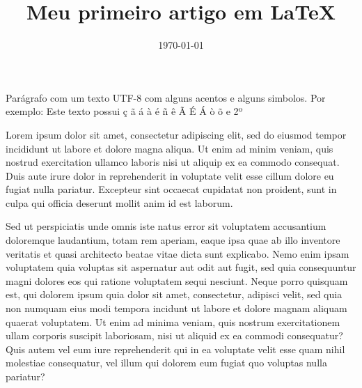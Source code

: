 \documentclass{article}
\title{Meu primeiro artigo em \LaTeX}
\date{\today}
\begin{document}
\maketitle

Parágrafo com um texto UTF-8 com alguns acentos e alguns simbolos.  
Por exemplo: Este texto possui ç ã á à é ñ ê Ã É Á ò õ e 2º


Lorem ipsum dolor sit amet, consectetur adipiscing elit, sed do eiusmod tempor incididunt ut labore et dolore magna aliqua. Ut enim ad minim veniam, quis nostrud exercitation ullamco laboris nisi ut aliquip ex ea commodo consequat. Duis aute irure dolor in reprehenderit in voluptate velit esse cillum dolore eu fugiat nulla pariatur. Excepteur sint occaecat cupidatat non proident, sunt in culpa qui officia deserunt mollit anim id est laborum. %

Sed ut perspiciatis unde omnis iste natus error sit voluptatem accusantium doloremque laudantium, totam rem aperiam, eaque ipsa quae ab illo inventore veritatis et quasi architecto beatae vitae dicta sunt explicabo. Nemo enim ipsam voluptatem quia voluptas sit aspernatur aut odit aut fugit, sed quia consequuntur magni dolores eos qui ratione voluptatem sequi nesciunt. Neque porro quisquam est, qui dolorem ipsum quia dolor sit amet, consectetur, adipisci velit, sed quia non numquam eius modi tempora incidunt ut labore et dolore magnam aliquam quaerat voluptatem. Ut enim ad minima veniam, quis nostrum exercitationem ullam corporis suscipit laboriosam, nisi ut aliquid ex ea commodi consequatur? Quis autem vel eum iure reprehenderit qui in ea voluptate velit esse quam nihil molestiae consequatur, vel illum qui dolorem eum fugiat quo voluptas nulla pariatur?
\end{document}
